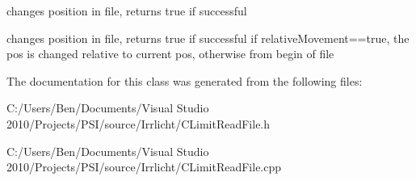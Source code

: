 changes position in file, returns true if successful 

changes position in file, returns true if successful if relative\-Movement==true, the pos is changed relative to current pos, otherwise from begin of file 

The documentation for this class was generated from the following files\-:\begin{DoxyCompactItemize}
\item 
C\-:/\-Users/\-Ben/\-Documents/\-Visual Studio 2010/\-Projects/\-P\-S\-I/source/\-Irrlicht/C\-Limit\-Read\-File.\-h\item 
C\-:/\-Users/\-Ben/\-Documents/\-Visual Studio 2010/\-Projects/\-P\-S\-I/source/\-Irrlicht/C\-Limit\-Read\-File.\-cpp\end{DoxyCompactItemize}
